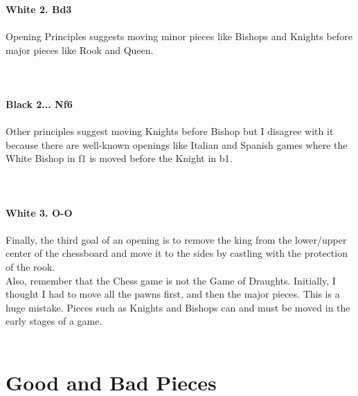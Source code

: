 \documentclass{article}
\begin{document}
\\

\\
\\
\textbf{White 2. Bd3}\\
\\
Opening Principles suggests moving minor pieces like Bishops and Knights before major pieces like Rook and Queen.\\
\\

\\
\\
\textbf{Black 2... Nf6}\\
\\
Other principles suggest moving Knights before Bishop but I disagree with it because there are well-known openings like Italian and Spanish games where the White Bishop in f1 is moved before the Knight in b1.\\
\\

\\
\\
\textbf{White 3. O-O}\\
\\
Finally, the third goal of an opening is to remove the king from the lower/upper center of the chessboard and move it to the sides by castling with the protection of the rook.\\Also, remember that the Chess game is not the Game of Draughts. Initially, I thought I had to move all the pawns first, and then the major pieces. This is a huge mistake. Pieces such as Knights and Bishops can and must be moved in the early stages of a game.\\
\\
\section{ Good and Bad Pieces}
\end{document}
